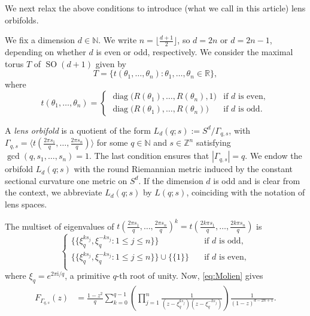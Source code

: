 \documentclass[12pt,a4paper,final]{amsart}
\theoremstyle{plain}
\theoremstyle{definition}
\theoremstyle{remark}
\numberwithin{equation}{section}
\newcommand{\N}{\mathbb N}
\newcommand{\Z}{\mathbb Z}
\newcommand{\R}{\mathbb R}
\DeclareMathOperator{\SO}{SO}
\newcommand{\mi}{\mathrm{i}}
\DeclareMathOperator{\diag}{diag}
\begin{document}
We next relax the above conditions to introduce (what we call in this article) lens orbifolds. 

We fix a dimension $d\in\N$. 
We write $n=\lfloor\frac{d+1}{2}\rfloor$, so $d=2n$ or $d=2n-1$, depending on whether $d$ is even or odd, respectively. 
We consider the maximal torus $T$ of $\SO(d+1)$ given by 
\begin{equation*}
T=
\big\{
t(\theta_1,\dots, \theta_{n})
:\theta_1,\dots, \theta_{n} \in\R
\big\}  ,
\end{equation*}
where 
\begin{equation*}
t(\theta_1,\dots, \theta_{n})=
\begin{cases}
\diag\big(
R(\theta_1),\dots,
R(\theta_{n}), 1\big)
	&\text{if $d$ is even},
\\
\diag \big(
R(\theta_1),\dots,
R(\theta_{n})\big)
	&\text{if $d$ is odd}.
\end{cases}
\end{equation*}

A \emph{lens orbifold} is a quotient of the form $L_d(q;s):=S^d/\Gamma_{q,s}$, with $\Gamma_{q,s}=\langle t(\frac{2\pi s_1}{q}, \dots, \frac{2\pi s_n}{q})\rangle$  for some $q\in\N$ and $s\in\Z^n$ satisfying $\gcd(q,s_1,\dots,s_n)=1$.  
The last condition ensures that $|\Gamma_{q,s}|=q$. 
We endow the orbifold $L_d(q;s)$ with the round Riemannian metric induced by the constant sectional curvature one metric on $S^d$. 
If the dimension $d$ is odd and is clear from the context, we abbreviate $L_d(q;s)$ by $L(q;s)$, coinciding with the notation of lens spaces. 


The multiset of eigenvalues of $t(\frac{2\pi s_1}{q}, \dots, \frac{2\pi s_n}{q})^k=t(\frac{2k\pi s_1}{q}, \dots, \frac{2k\pi s_n}{q})$ is
\begin{equation}\label{eq:eigenvalues}
\begin{cases}
\{\!\{\xi_q^{k s_j}, \xi_q^{-k s_j}:1\leq j\leq n\}\!\}
	&\quad\text{if $d$ is odd},\\
\{\!\{\xi_q^{k s_j}, \xi_q^{-k s_j}:1\leq j\leq n\}\!\}\cup\{\!\{1\}\!\}
	&\quad\text{if $d$ is even},\\
\end{cases}
\end{equation} 
where $\xi_q=e^{2\pi\mi /q}$, a primitive $q$-th root of unity. 
Now, \eqref{eq:Molien} gives
\begin{equation}\label{eq:MolienLens}
\begin{aligned}
F_{\Gamma_{q,s}}(z)&
=\frac{1-z^2}{q} \sum_{k=0}^{q-1} 
	\left(\prod_{j=1}^n \frac{1}{(z-\xi_q^{ks_j})(z-\xi_q^{-ks_j})}
	\right) 
	\frac{1}{(1-z)^{d-2n+1}}
	.
\end{aligned}
\end{equation}
\end{document}
